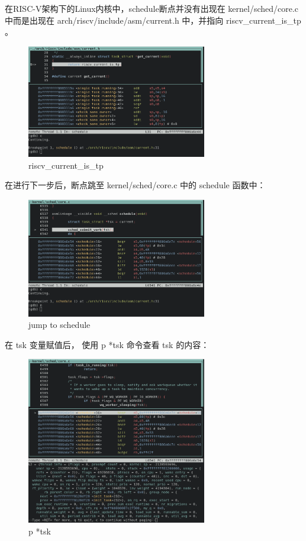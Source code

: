 \documentclass[lang=cn,10pt]{elegantbook}
\begin{document}
在RISC-V架构下的Linux内核中，schedule断点并没有出现在 kernel/sched/core.c 中而是出现在 arch/riscv/include/asm/current.h 中，并指向 riscv\_current\_is\_tp 。
\begin{figure}[htbp]
  \centering
  \includegraphics[width=0.7\textwidth]{image/image-20231109201842239.png}
  \caption{riscv\_current\_is\_tp}
\end{figure}

\newpage
在进行下一步后，断点跳至 kernel/sched/core.c 中的 schedule 函数中：
\begin{figure}[htbp]
  \centering
  \includegraphics[width=0.7\textwidth]{image/image-20231109202045031.png}
  \caption{jump to schedule}
\end{figure}


\newpage
在 tsk 变量赋值后， 使用 p *tsk 命令查看 tsk 的内容：
\begin{figure}[htbp]
  \centering
  \includegraphics[width=0.7\textwidth]{image/image-20231109202345331.png}
  \caption{p *tsk}
\end{figure}
\end{document}
